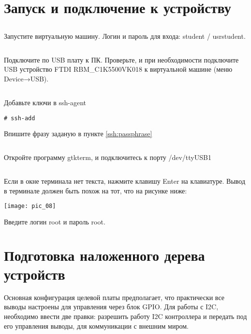 \section{Запуск и подключение к устройству}

\subsection{}Запустите виртуальную машину. Логин и пароль для входа: student / usrstudent.

\subsection{}Подключите по USB плату к ПК. Проверьте, и при необходимости подключите USB устройство FTDI RBM\_C1K5500VK018 к виртуальной машине (меню Device→USB).

\subsection{}Добавьте ключи в ssh-agent
\begin{lstlisting}[style=bash]
	# ssh-add
\end{lstlisting}
Впишите фразу заданую в пункте \ref{ssh:passphrase}

\subsection{}Откройте программу gtkterm, и подключитесь к порту /dev/ttyUSB1

\subsection{}Если в окне терминала нет текста, нажмите клавишу Enter на клавиатуре. Вывод в терминале должен быть похож на тот, что на рисунке ниже:
\begin{center}
	\texttt{[image: pic\_08]}
\end{center}
Введите логин root и пароль root.

\section{Подготовка наложенного дерева устройств}

Основная конфигурация целевой платы предполагает, что практически все выводы настроены для управления через блок GPIO. Для работы с I2C, необходимо ввести две правки: разрешить работу I2C контроллера и передать под его управления выводы, для коммуникации с внешним миром.  

